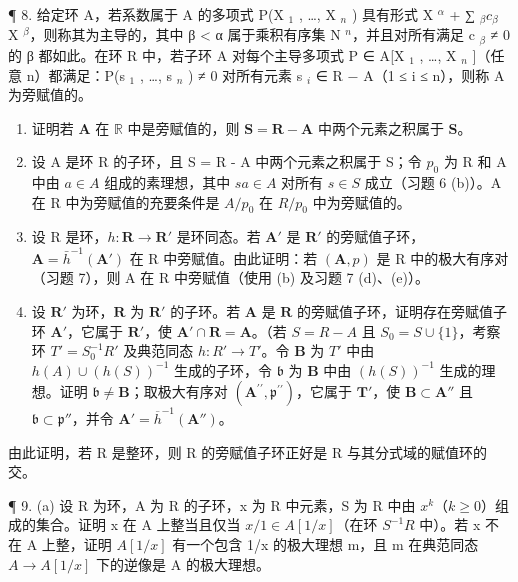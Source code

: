 ¶ 8. 给定环 A，若系数属于 A 的多项式 P(X \(_{1}\) , \ldots, X \(_{n}\) ) 具有形式 X \(^{\alpha}\) + ∑ \(_{\beta} c_{\beta}\) X \(^{\beta}\)，则称其为主导的，其中 β \textless{} α 属于乘积有序集 N \(^{n}\)，并且对所有满足 c \(_{\beta}\) ≠ 0 的 β 都如此。在环 R 中，若子环 A 对每个主导多项式 P ∈ A{[}X \(_{1}\) , \ldots, X \(_{n}\) {]}（任意 n）都满足：P(s \(_{1}\) , \ldots, s \(_{n}\) ) ≠ 0 对所有元素 s \(_{i}\) ∈ R − A（1 ≤ i ≤ n），则称 A 为旁赋值的。

\begin{enumerate}
\def\labelenumi{(\alph{enumi})}
\item
  证明若 \(\mathbf{A}\) 在 \(\mathbb{R}\) 中是旁赋值的，则 \(\mathbf{S} = \mathbf{R} - \mathbf{A}\) 中两个元素之积属于 \(\mathbf{S}\)。
\item
  设 A 是环 R 的子环，且 S = R - A 中两个元素之积属于 S；令 \(p_{0}\) 为 R 和 A 中由 \(a \in A\) 组成的素理想，其中 \(sa \in A\) 对所有 \(s \in S\) 成立（习题 6 (b)）。A 在 R 中为旁赋值的充要条件是 \(A/p_{0}\) 在 \(R/p_{0}\) 中为旁赋值的。
\item
  设 R 是环，\(h: \mathbf{R} \to \mathbf{R}'\) 是环同态。若 \(\mathbf{A}'\) 是 \(\mathbf{R}'\) 的旁赋值子环，\(\mathbf{A} = \bar{h}^{-1}(\mathbf{A}')\) 在 R 中旁赋值。由此证明：若 \((\mathbf{A}, p)\) 是 R 中的极大有序对（习题 7），则 A 在 R 中旁赋值（使用 (b) 及习题 7 (d)、(e)）。
\item
  设 \(\mathbf{R}'\) 为环，\(\mathbf{R}\) 为 \(\mathbf{R}'\) 的子环。若 \(\mathbf{A}\) 是 \(\mathbf{R}\) 的旁赋值子环，证明存在旁赋值子环 \(\mathbf{A}'\)，它属于 \(\mathbf{R}'\)，使 \(\mathbf{A}' \cap \mathbf{R} = \mathbf{A}\)。（若 \(S = R - A\) 且 \(S_0 = S \cup \{1\}\)，考察环 \(T' = S_0^{-1}R'\) 及典范同态 \(h: R' \to T'\)。令 \(\mathbf{B}\) 为 \(T'\) 中由 \(h(A) \cup (h(S))^{-1}\) 生成的子环，令 \(\mathfrak{b}\) 为 \(\mathbf{B}\) 中由 \((h(S))^{-1}\) 生成的理想。证明 \(\mathfrak{b} \neq \mathbf{B}\)；取极大有序对 \((\mathbf{A}^{\prime \prime}, \mathfrak{p}^{\prime \prime})\)，它属于 \(\mathbf{T}'\)，使 \(\mathbf{B} \subset \mathbf{A}''\) 且 \(\mathfrak{b} \subset \mathfrak{p}''\)，并令 \(\mathbf{A}' = \overline{h}^{-1}(\mathbf{A}'')\)。
\end{enumerate}

由此证明，若 R 是整环，则 R 的旁赋值子环正好是 R 与其分式域的赋值环的交。

¶ 9. (a) 设 R 为环，A 为 R 的子环，x 为 R 中元素，S 为 R 中由 \(x^{k}\)（\(k \geqslant 0\)）组成的集合。证明 x 在 A 上整当且仅当 \(x/1 \in A[1/x]\)（在环 \(S^{-1}R\) 中）。若 x 不在 A 上整，证明 \(A[1/x]\) 有一个包含 1/x 的极大理想 m，且 m 在典范同态 \(A \to A[1/x]\) 下的逆像是 A 的极大理想。

